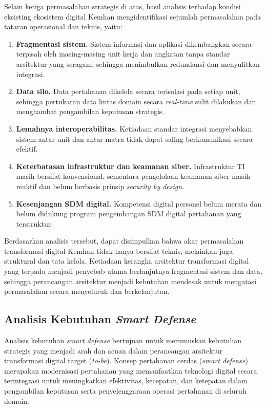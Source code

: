 Selain ketiga permasalahan strategis di atas, hasil analisis terhadap kondisi eksisting ekosistem digital Kemhan mengidentifikasi sejumlah permasalahan pada tataran operasional dan teknis, yaitu:
\begin{enumerate}
  \item \textbf{Fragmentasi sistem.} Sistem informasi dan aplikasi dikembangkan secara terpisah oleh masing-masing unit kerja dan angkatan tanpa standar arsitektur yang seragam, sehingga menimbulkan redundansi dan menyulitkan integrasi.
  \item \textbf{Data silo.} Data pertahanan dikelola secara terisolasi pada setiap unit, sehingga pertukaran data lintas domain secara \textit{real-time} sulit dilakukan dan menghambat pengambilan keputusan strategis.
  \item \textbf{Lemahnya interoperabilitas.} Ketiadaan standar integrasi menyebabkan sistem antar-unit dan antar-matra tidak dapat saling berkomunikasi secara efektif.
  \item \textbf{Keterbatasan infrastruktur dan keamanan siber.} Infrastruktur TI masih bersifat konvensional, sementara pengelolaan keamanan siber masih reaktif dan belum berbasis prinsip \textit{security by design}.
  \item \textbf{Kesenjangan SDM digital.} Kompetensi digital personel belum merata dan belum didukung program pengembangan SDM digital pertahanan yang terstruktur.
\end{enumerate}

Berdasarkan analisis tersebut, dapat disimpulkan bahwa akar permasalahan transformasi digital Kemhan tidak hanya bersifat teknis, melainkan juga struktural dan tata kelola.
Ketiadaan kerangka arsitektur transformasi digital yang terpadu menjadi penyebab utama berlanjutnya fragmentasi sistem dan data, sehingga perancangan arsitektur menjadi kebutuhan mendesak untuk mengatasi permasalahan secara menyeluruh dan berkelanjutan.

\subsection{Analisis Kebutuhan \textit{Smart Defense}}
Analisis kebutuhan \textit{smart defense} bertujuan untuk merumuskan kebutuhan strategis yang menjadi arah dan acuan dalam perancangan arsitektur transformasi digital target (\textit{to-be}).
Konsep pertahanan cerdas (\textit{smart defense}) merupakan modernisasi pertahanan yang memanfaatkan teknologi digital secara terintegrasi untuk meningkatkan efektivitas, kecepatan, dan ketepatan dalam pengambilan keputusan serta penyelenggaraan operasi pertahanan di seluruh domain.

